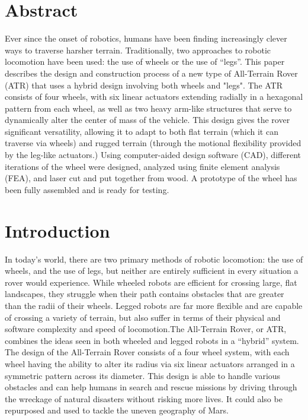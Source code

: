 \documentclass[12pt]{article}
\numberwithin{figure}{section}
\begin{document}
\begin{multicols}{2}
\section*{Abstract}
Ever since the onset of robotics, humans have been finding increasingly clever ways to traverse harsher terrain. Traditionally, two approaches to robotic locomotion have been used: the use of wheels or the use of “legs”. This paper describes the design and construction process of a new type of All-Terrain Rover (ATR) that uses a hybrid design involving both wheels and "legs". The ATR consists of four wheels, with six linear actuators extending radially in a hexagonal pattern from each wheel, as well as two heavy arm-like structures that serve to dynamically alter the center of mass of the vehicle. This design gives the rover significant versatility, allowing it to adapt to both flat terrain (which it can traverse via wheels) and rugged terrain (through the motional flexibility provided by the leg-like actuators.) Using computer-aided design software (CAD), different iterations of the wheel were designed, analyzed using finite element analysis (FEA), and laser cut and put together from wood. A prototype of the wheel has been fully assembled and is ready for testing.
\section{Introduction}
In today’s world, there are two primary methods of robotic locomotion: the use of wheels, and the use of legs, but neither are entirely sufficient in every situation a rover would experience. While wheeled robots are efficient for crossing large, flat landscapes, they struggle when their path contains obstacles that are greater than the radii of their wheels. Legged robots are far more flexible and are capable of crossing a variety of terrain, but also suffer in terms of their physical and software complexity and speed of locomotion.The All-Terrain Rover, or ATR, combines the ideas seen in both wheeled and legged robots in a “hybrid” system. The design of the All-Terrain Rover consists of a four wheel system, with each wheel having the ability to alter its radius via six linear actuators arranged in a symmetric pattern across its diameter. This design is able to handle various obstacles and can help humans in search and rescue missions by driving through the wreckage of natural disasters without risking more lives. It could also be repurposed and used to tackle the uneven geography of Mars. 


\end{multicols}
\end{document}
